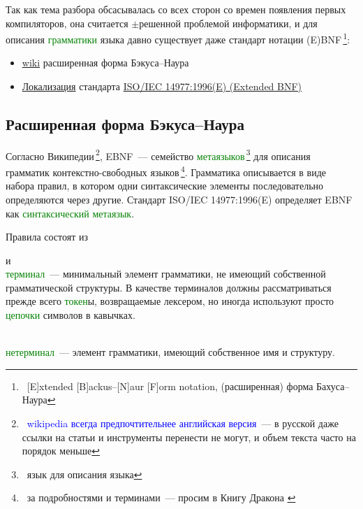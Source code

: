 \documentclass[oneside,10pt]{article}
\renewcommand{\emph}[1]{\textcolor{blue}{#1}}
\newcommand{\note}[1]{\,\footnote{\ #1}}
\newcommand{\term}[1]{\textcolor{green}{#1}}
\begin{document}
Так как тема разбора обсасывалась со всех сторон со времен появления первых
компиляторов, она считается $\pm$решенной проблемой информатики, и для описания
\term{грамматики} языка давно существует даже стандарт нотации
(E)BNF\note{[E]xtended [B]ackus--[N]aur [F]orm notation, (расширенная) форма
Бахуса--Наура}:
\begin{itemize}
  \item
  \href{https://ru.wikipedia.org/wiki/%D0%A0%D0%B0%D1%81%D1%88%D0%B8%D1%80%D0%B5%D0%BD%D0%BD%D0%B0%D1%8F_%D1%84%D0%BE%D1%80%D0%BC%D0%B0_%D0%91%D1%8D%D0%BA%D1%83%D1%81%D0%B0_%E2%80%94_%D0%9D%D0%B0%D1%83%D1%80%D0%B0}{wiki}
  расширенная форма Бэкуса--Наура
  \item
  \href{https://groups.google.com/forum/?hl=ru#!forum/localizations}{Локализация}
  стандарта
  \href{http://standards.iso.org/ittf/PubliclyAvailableStandards/s026153_ISO_IEC_14977_1996(E).zip}{ISO/IEC
  14977:1996(E) (Extended BNF)}
\end{itemize}

\subsection{Расширенная форма Бэкуса--Наура}

Согласно Википедии\note{\emph{wikipedia всегда предпочтительнее английская
версия}\ --- в русской даже ссылки на статьи и инструменты перенести не могут, и
объем текста часто на порядок меньше}, EBNF\ --- семейство
\term{метаязыков}\note{язык для описания языка} для описания грамматик
контекстно-свободных языков\note{за подробностями и терминами\ --- просим в
Книгу Дракона \cite{dragon}}. Грамматика описывается в виде набора правил,
в котором одни синтаксические элементы последовательно определяются через
другие.
Стандарт ISO/IEC 14977:1996(E) определяет EBNF как \term{синтаксический
метаязык}.

\clearpage
Правила состоят из
\begin{description}[nosep]
  \item[ \term{терминал}ов = терминальных символов] и\ \\
  \term{терминал}\ --- минимальный элемент грамматики, не имеющий собственной
  грамматической структуры. В качестве терминалов должны рассматриваться
  прежде всего \term{токен}ы, возвращаемые лексером, но иногда используют
  просто \term{цепочки} символов в кавычках.
  \item[ \term{нетерминал}ов = продукционных правил]\ \\
  \term{нетерминал}\ --- элемент грамматики, имеющий собственное имя и
  структуру.
\end{description}
\end{document}
